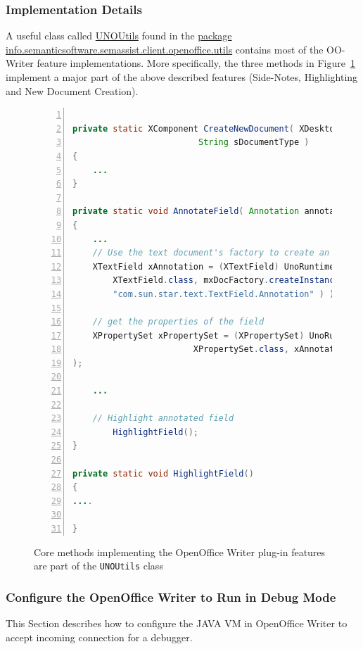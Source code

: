 \subsubsection{Implementation Details}
A useful class called \url{UNOUtils} found in the \url{package
  info.semanticsoftware.semassist.client.openoffice.utils} contains most of
the OO-Writer feature implementations.  More specifically, the three methods in
Figure~\ref{list:ssb} implement a major part of the above described features
(Side-Notes, Highlighting and New Document Creation).

\begin{figure}
\centering
\begin{lstlisting}[language=Java,numbers=left,xleftmargin=8mm,columns=flexible]

private static XComponent CreateNewDocument( XDesktop xDesktop, 
					     String sDocumentType )
{
	...
}

private static void AnnotateField( Annotation annotation )
{
	...
	// Use the text document's factory to create an Annotation text field
	XTextField xAnnotation = (XTextField) UnoRuntime.queryInterface(
		XTextField.class, mxDocFactory.createInstance(
		"com.sun.star.text.TextField.Annotation" ) );
	
	// get the properties of the field
	XPropertySet xPropertySet = (XPropertySet) UnoRuntime.queryInterface( 
						XPropertySet.class, xAnnotation
);
	
	...
	
	// Highlight annotated field
        HighlightField();
}

private static void HighlightField()
{
....

}
\end{lstlisting}
\caption{Core methods implementing the OpenOffice Writer plug-in features are
  part of the \texttt{UNOUtils} class}
\label{list:ssb}
\end{figure}

 
\subsubsection{Configure the OpenOffice Writer to Run in Debug Mode}
This Section describes how to configure the JAVA VM in OpenOffice Writer to accept incoming connection for a debugger.

